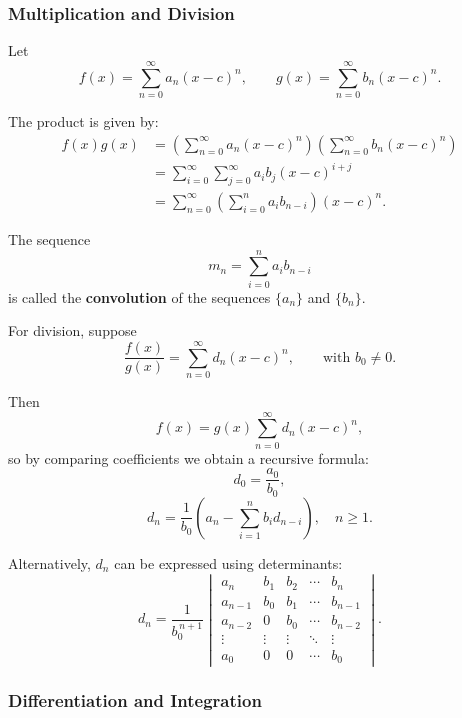 \subsubsection{Multiplication and Division}
\label{sss:mult-c79b}

Let
\[
f(x) = \sum_{n=0}^{\infty} a_n (x-c)^n,
\qquad
g(x) = \sum_{n=0}^{\infty} b_n (x-c)^n.
\]

The product is given by:
\begin{align}
f(x)g(x)
&= \left(\sum_{n=0}^{\infty} a_n (x-c)^n\right)
   \left(\sum_{n=0}^{\infty} b_n (x-c)^n\right) \\
&= \sum_{i=0}^{\infty} \sum_{j=0}^{\infty} a_i b_j (x-c)^{i+j} \\
&= \sum_{n=0}^{\infty} \left( \sum_{i=0}^{n} a_i b_{n-i} \right) (x-c)^n.
\end{align}

The sequence
\[
m_n = \sum_{i=0}^{n} a_i b_{n-i}
\]
is called the \textbf{convolution} of the sequences $\{a_n\}$ and $\{b_n\}$.

\medskip

For division, suppose
\[
\frac{f(x)}{g(x)} = \sum_{n=0}^{\infty} d_n (x-c)^n,
\qquad \text{with } b_0 \neq 0.
\]

Then
\[
f(x) = g(x)\sum_{n=0}^{\infty} d_n (x-c)^n,
\]
so by comparing coefficients we obtain a recursive formula:
\[
d_0 = \frac{a_0}{b_0},
\]
\[
d_n = \frac{1}{b_0}\left(a_n - \sum_{i=1}^{n} b_i d_{n-i}\right), \quad n \ge 1.
\]

\medskip

Alternatively, $d_n$ can be expressed using determinants:
\[
d_n = \frac{1}{b_0^{\,n+1}}
\begin{vmatrix}
a_n      & b_1      & b_2      & \cdots & b_n \\
a_{n-1}  & b_0      & b_1      & \cdots & b_{n-1} \\
a_{n-2}  & 0        & b_0      & \cdots & b_{n-2} \\
\vdots   & \vdots   & \vdots   & \ddots & \vdots \\
a_0      & 0        & 0        & \cdots & b_0
\end{vmatrix}.
\]

\subsubsection{Differentiation and Integration}
\label{sss:diff-fcae}

